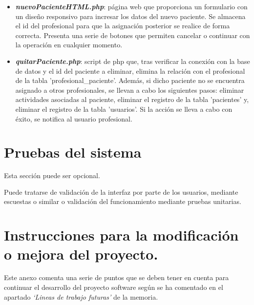 \begin{itemize}
\begin{itemize}
\begin{itemize}
            \item \textbf{\textit{nuevoPacienteHTML.php}}: página web que proporciona un formulario con un diseño responsivo para incresar los datos del nuevo paciente. Se almacena el id del profesional para que la asignación posterior se realice de forma correcta. Presenta una serie de botones que permiten cancelar o continuar con la operación en cualquier momento.
            \item \textbf{\textit{quitarPaciente.php}}: script de php que, tras verificar la conexión con la base de datos y el id del paciente a eliminar, elimina la relación con el profesional de la tabla 'profesional\_paciente'. Además, si dicho paciente no se encuentra asignado a otros profesionales, se llevan a cabo los siguientes pasos: eliminar actividades asociadas al paciente, eliminar el registro de la tabla 'pacientes' y, eliminar el registro de la tabla 'usuarios'. Si la acción se lleva a cabo con éxito, se notifica al usuario profesional.
        \end{itemize}
    \end{itemize}
\end{itemize}

\section{Pruebas del sistema}
Esta sección puede ser opcional.

Puede tratarse de validación de la interfaz por parte de los usuarios, mediante escuestas o similar o validación del funcionamiento mediante pruebas unitarias.



\section{Instrucciones para la modificación o mejora del proyecto.}

Este anexo comenta una serie de puntos que se deben tener en cuenta para continuar el desarrollo del proyecto software según se ha comentado en el apartado \textit{`Lineas de trabajo futuras'} de la memoria.

